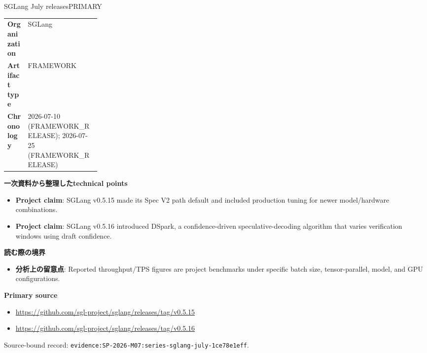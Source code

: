 \begin{technicalnote}{SGLang July releases}{PRIMARY}
\begin{tabularx}{\linewidth}{@{}>{\bfseries}p{0.22\linewidth}X@{}}
Organization & SGLang \\
Artifact type & FRAMEWORK \\
Chronology & 2026-07-10 (FRAMEWORK\_RELEASE); 2026-07-25 (FRAMEWORK\_RELEASE) \\
\end{tabularx}
\smallskip
{\bfseries 一次資料から整理したtechnical points}
\begin{itemize}[leftmargin=1.5em,itemsep=0.35em]
\item \textbf{Project claim}: SGLang v0.5.15 made its Spec V2 path default and included production tuning for newer model/hardware combinations.
\item \textbf{Project claim}: SGLang v0.5.16 introduced DSpark, a confidence-driven speculative-decoding algorithm that varies verification windows using draft confidence.
\end{itemize}
{\bfseries 読む際の境界}
\begin{itemize}[leftmargin=1.5em,itemsep=0.35em]
\item \textbf{分析上の留意点}: Reported throughput/TPS figures are project benchmarks under specific batch size, tensor-parallel, model, and GPU configurations.
\end{itemize}
{\bfseries Primary source}
\begin{itemize}[leftmargin=1.5em,itemsep=0.25em]
\item \url{https://github.com/sgl-project/sglang/releases/tag/v0.5.15}
\item \url{https://github.com/sgl-project/sglang/releases/tag/v0.5.16}
\end{itemize}
{\scriptsize\color{SurveyMuted}Source-bound record: \texttt{evidence:SP-2026-M07:series-sglang-july-1ce78e1eff}.}
\end{technicalnote}
\medskip

